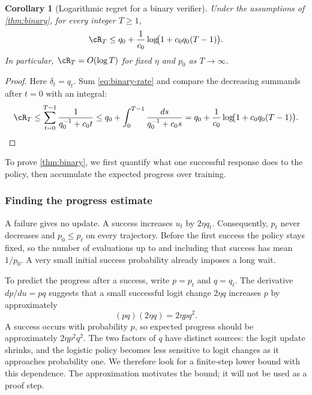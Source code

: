 \documentclass[11pt,twoside]{article}
\newtheorem{corollary}[theorem]{Corollary}
\theoremstyle{definition}
\theoremstyle{remark}
\begin{document}
\begin{corollary}[Logarithmic regret for a binary verifier]
\label{cor:binary-regret}
Under the assumptions of \cref{thm:binary}, for every integer $T\ge1$,
\[
 \cR_T\le q_0+\frac1{c_0}\log\!\bigl(1+c_0q_0(T-1)\bigr).
\]
In particular, $\cR_T=O(\log T)$ for fixed $\eta$ and $p_0$ as $T\to\infty$.
\end{corollary}
\begin{proof}
Here $\delta_t=q_t$. Sum \cref{eq:binary-rate} and compare the decreasing
summands after $t=0$ with an integral:
\[
 \cR_T\le\sum_{t=0}^{T-1}\frac1{q_0^{-1}+c_0t}
 \le q_0+\int_0^{T-1}\frac{ds}{q_0^{-1}+c_0s}
 =q_0+\frac1{c_0}\log\!\bigl(1+c_0q_0(T-1)\bigr).
\]
\end{proof}

To prove \cref{thm:binary}, we first quantify what one successful response
does to the policy, then accumulate the expected progress over training.

\subsubsection{Finding the progress estimate}

A failure gives no update. A success increases $u_t$ by $2\eta q_t$.
Consequently, $p_t$ never decreases and $p_0\le p_t$ on every trajectory.
Before the first success the policy stays fixed, so the number of evaluations
up to and including that success has mean $1/p_0$. A very small initial
success probability already imposes a long wait.

To predict the progress after a success, write $p=p_t$ and $q=q_t$.
The derivative $dp/du=pq$ suggests that a small successful logit change
$2\eta q$ increases $p$ by approximately
\[
 (pq)(2\eta q)=2\eta p q^2.
\]
A success occurs with probability $p$, so expected progress should be
approximately $2\eta p^2q^2$. The two factors of $q$ have distinct sources:
the logit update shrinks, and the logistic policy becomes less sensitive to
logit changes as it approaches probability one. We therefore look for a
finite-step lower bound with this dependence. The approximation motivates
the bound; it will not be used as a proof step.
\end{document}
